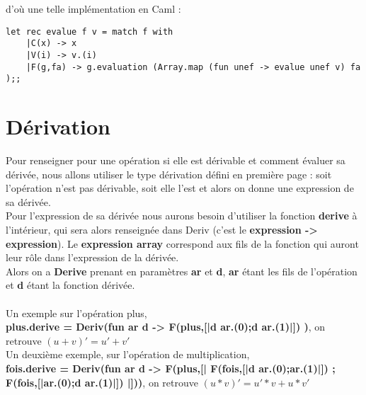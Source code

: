 \documentclass{article}
\theoremstyle{definition}
\begin{document}
d'o\`u une telle impl\'ementation en Caml : 
\begin{lstlisting}
let rec evalue f v = match f with
    |C(x) -> x
    |V(i) -> v.(i)
    |F(g,fa) -> g.evaluation (Array.map (fun unef -> evalue unef v) fa );;
\end{lstlisting}

\section{D\'erivation}
Pour renseigner pour une op\'eration si elle est d\'erivable et comment \'evaluer sa d\'eriv\'ee, nous allons utiliser le type d\'erivation d\'efini en premi\`ere page : soit l'op\'eration n'est pas d\'erivable, soit elle l'est et alors on donne une expression de sa d\'eriv\'ee.\\
Pour l'expression de sa d\'eriv\'ee nous aurons besoin d'utiliser la fonction \textbf{derive} \`a l'int\'erieur, qui sera alors renseign\'ee dans Deriv (c'est le \textbf{expression -> expression}). Le \textbf{expression array} correspond aux fils de la fonction qui auront leur r\^ole dans l'expression de la d\'eriv\'ee.\\
Alors on a \textbf{Derive} prenant en param\`etres \textbf{ar} et \textbf{d}, \textbf{ar} \'etant les fils de l'op\'eration et \textbf{d} \'etant la fonction d\'eriv\'ee.\\\\

Un exemple sur l'op\'eration plus,\\
\textbf{plus.derive = Deriv(fun ar d -> F(plus,[|d ar.(0);d ar.(1)|]) )}, on retrouve $(u+v)'=u'+v'$\\
Un deuxi\`eme exemple, sur l'op\'eration de multiplication,
\\ \textbf{fois.derive = Deriv(fun ar d -> F(plus,[| F(fois,[|d ar.(0);ar.(1)|]) ; F(fois,[|ar.(0);d ar.(1)|]) |]))}, on retrouve $(u*v)' = u'*v + u*v'$\\\\
\end{document}

